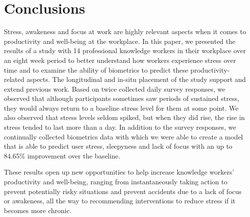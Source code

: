 \section{Conclusions} 
Stress, awakeness and focus at work are highly relevant aspects when
it comes to productivity and well-being at the workplace. In this
paper, we presented the results of a study with 14 professional
knowledge workers in their workplace over an eight week period to
better understand how workers experience stress over time and to
examine the ability of biometrics to predict these
productivity-related aspects. The longitudinal and in-situ placement of
the study support and extend previous work. Based on
twice collected daily survey responses, we observed that
although participants sometimes saw periods of sustained stress,
they would always return to a baseline stress level for them
at some point. We also observed that stress levels seldom spiked,
but when they did rise, the rise in stress tended to last more
than a day. In addition to the survey responses, we 
continually collected
biometrics data with which we were able to create a model that is able to
predict user stress, sleepyness and lack of focus with an up to 84.65\% improvement over the baseline.

These results open up new opportunities to help increase knowledge
workers' productivity and well-being, ranging from instantaneously
taking action to prevent potentially risky situations and prevent
accidents due to a lack of focus or awakeness, all the way to
recommending interventions to reduce stress if it becomes more
chronic.




